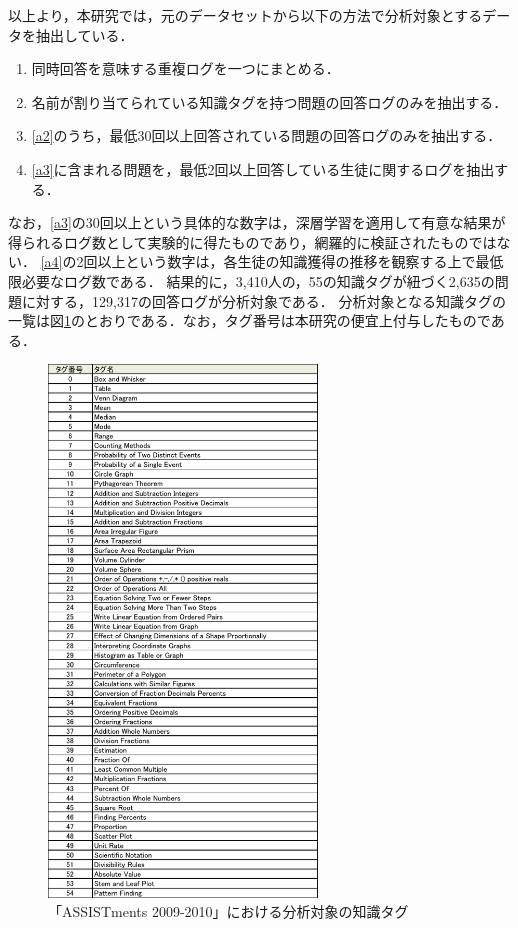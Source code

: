 以上より，本研究では，元のデータセットから以下の方法で分析対象とするデータを抽出している．
\begin{enumerate}
	\item 同時回答を意味する重複ログを一つにまとめる．\label{a1}
	\item 名前が割り当てられている知識タグを持つ問題の回答ログのみを抽出する．\label{a2}
	\item \ref{a2}のうち，最低30回以上回答されている問題の回答ログのみを抽出する．\label{a3}
	\item \ref{a3}に含まれる問題を，最低2回以上回答している生徒に関するログを抽出する．\label{a4}
\end{enumerate}

なお，\ref{a3}の30回以上という具体的な数字は，深層学習を適用して有意な結果が得られるログ数として実験的に得たものであり，網羅的に検証されたものではない．
\ref{a4}の2回以上という数字は，各生徒の知識獲得の推移を観察する上で最低限必要なログ数である．
結果的に，3,410人の，55の知識タグが紐づく2,635の問題に対する，129,317の回答ログが分析対象である．
分析対象となる知識タグの一覧は図\ref{fig:aTable3}のとおりである．なお，タグ番号は本研究の便宜上付与したものである．

\begin{figure}[htb]
\begin{center}
\includegraphics[height=400pt]{./img/aTable3.pdf}
\end{center}
\caption{「ASSISTments 2009-2010」における分析対象の知識タグ}
\label{fig:aTable3}
\end{figure}


